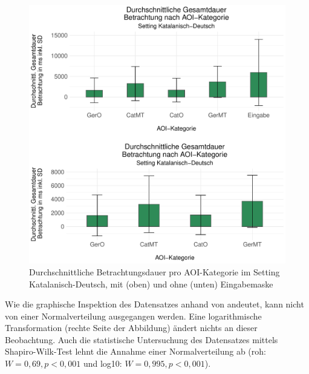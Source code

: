 


\begin{figure}
    \includegraphics[width=\textwidth]{Figures/EyeTracking/CatDe/ggplot_catde_mean-dwell_AOI-grid-arrange_de}
	\caption{Durchschnittliche Betrachtungsdauer pro AOI-Kategorie im Setting Katalanisch-Deutsch, mit (oben) und ohne (unten) Eingabemaske\label{K6:fig:CatDe:mean-error-dwell}}
\end{figure}


Wie die graphische Inspektion des Datensatzes anhand von  andeutet, kann nicht von einer Normalverteilung ausgegangen werden. Eine logarithmische Transformation (rechte Seite der Abbildung) ändert nichts an dieser Beobachtung. Auch die statistische Untersuchung des Datensatzes mittels Shapiro-Wilk-Test lehnt die Annahme einer Normalverteilung ab (roh: $W = 0,69, p < 0,001$ und log10: $W = 0,995, p < 0,001$).


